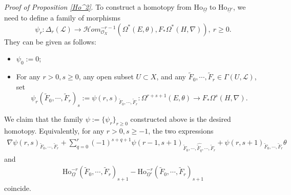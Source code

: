 \documentclass[12pt, a4paper]{article}
\begin{document}
\emph{Proof of Proposition \ref{Ho^2}}. To construct a homotopy from $\mathrm{Ho}_{\underline\Omega}$ to $\mathrm{Ho}_{\underline\Omega'}$, we need to define a family of morphisms
$$
\psi_r:\Delta_r(\mathcal L)\to\mathcal Hom^{-r-1}_{\mathcal O_X}(\Omega^*(E,\theta),F_*\Omega^*(H,\nabla)),~r\geq0.
$$
They can be given as follows:
\begin{itemize}
    \item $\psi_0:=0$;
    \item For any $r>0,s\geq0$, any open subset $U\subset X$, and any $\tilde F_0,\cdots,\tilde F_r\in\Gamma(U,\mathcal L)$, set
    $$
    \psi_r(\tilde F_0,\cdots,\tilde F_r)_s:=\psi(r,s)_{\tilde F_0,\cdots,\tilde F_r}:\Omega^{r+s+1}(E,\theta)\to F_*\Omega^s(H,\nabla).
    $$
\end{itemize}
We claim that the family $\psi:=\{\psi_r\}_{r\geq0}$ constructed above is the desired homotopy. Equivalently, for any $r>0,s\geq-1$, the two expressions
\begin{eqnarray}\label{psi L}
  \nabla\psi(r,s)_{\tilde F_0,\cdots,\tilde F_r}+\sum_{q=0}^r(-1)^{s+q+1}\psi(r-1,s+1)_{\tilde F_0,\cdots,\widehat{\tilde F_q},\cdots,\tilde F_r}+\psi(r,s+1)_{\tilde F_0,\cdots,\tilde F_r}\theta\end{eqnarray}
and
\begin{eqnarray}\label{psi R}
    \mathrm{Ho}_{\underline\Omega}^{-r}(\tilde F_0,\cdots,\tilde F_r)_{s+1}-\mathrm{Ho}_{\underline\Omega'}^{-r}(\tilde F_0,\cdots,\tilde F_r)_{s+1}
    \end{eqnarray}
coincide.
\end{document}
